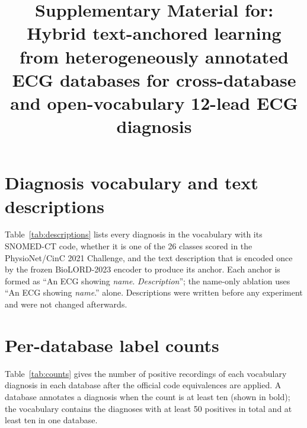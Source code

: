 \documentclass[pdflatex,sn-mathphys-num]{sn-jnl}
\begin{document}
\title[Supplementary Material]{Supplementary Material for: Hybrid text-anchored learning from heterogeneously annotated ECG databases for cross-database and open-vocabulary 12-lead ECG diagnosis}

\author*[1]{ }

\author[2]{ }





\maketitle

\section{Diagnosis vocabulary and text descriptions}\label{supp:descriptions}
Table~\ref{tab:descriptions} lists every diagnosis in the vocabulary with its SNOMED-CT code, whether it is one of the 26 classes scored in the PhysioNet/CinC 2021 Challenge, and the text description that is encoded once by the frozen BioLORD-2023 encoder to produce its anchor. Each anchor is formed as ``An ECG showing \textit{name}. \textit{Description}''; the name-only ablation uses ``An ECG showing \textit{name}.'' alone. Descriptions were written before any experiment and were not changed afterwards.



\section{Per-database label counts}\label{supp:counts}
Table~\ref{tab:counts} gives the number of positive recordings of each vocabulary diagnosis in each database after the official code equivalences are applied. A database annotates a diagnosis when the count is at least ten (shown in bold); the vocabulary contains the diagnoses with at least 50 positives in total and at least ten in one database.
\end{document}
